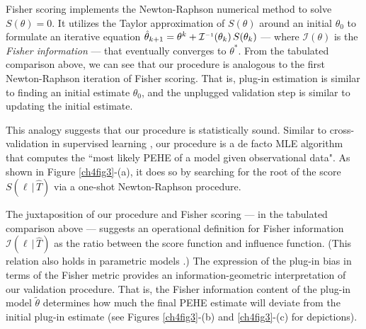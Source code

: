 \documentclass [PhD] {uclathes}
\begin{document}
Fisher scoring implements the Newton-Raphson numerical method to solve \mbox{\footnotesize $S(\theta) = 0$}. It utilizes the Taylor approximation of \mbox{\footnotesize $S(\theta)$} around an initial \mbox{\footnotesize $\theta_0$} to formulate an iterative equation \mbox{\footnotesize $\hat{\theta}_{k+1} = \theta^k + \mathcal{I}^{\mbox{\tiny $-1$}}(\theta_k)\,S(\theta_k)$} --- where \mbox{\footnotesize $\mathcal{I}(\theta)$} is the {\it Fisher information} --- that eventually converges to \mbox{\footnotesize $\theta^*$}. From the tabulated comparison above, we can see that our procedure is analogous to the first Newton-Raphson iteration of Fisher scoring. That is, plug-in estimation is similar to finding an initial estimate \mbox{\footnotesize $\theta_0$}, and the unplugged validation step is similar to updating the initial estimate. 

This analogy suggests that our procedure is statistically sound. Similar to cross-validation in supervised learning \cite{dudoit2005asymptotics}, our procedure is a de facto MLE algorithm that computes the ``{most likely PEHE of a model given observational data}". As shown in Figure \ref{ch4fig3}-(a), it does so by searching for the root of the score \mbox{\footnotesize $S(\boldsymbol{\ell}\,|\,\widehat{T})$} via a one-shot Newton-Raphson procedure. 

The juxtaposition of our procedure and Fisher scoring --- in the tabulated comparison above --- suggests an operational definition for Fisher information \mbox{\footnotesize $\mathcal{I}(\boldsymbol{\ell}\,|\,\widehat{T})$} as the ratio between the score function and influence function. (This relation also holds in parametric models \cite{basu1998robust}.) The expression of the plug-in bias in terms of the Fisher metric provides an information-geometric interpretation of our validation procedure. That is, the Fisher information content of the plug-in model \mbox{\footnotesize $\tilde{\theta}$} determines how much the final PEHE estimate will deviate from the initial plug-in estimate (see Figures \ref{ch4fig3}-(b) and \ref{ch4fig3}-(c) for depictions). 
\end{document}
